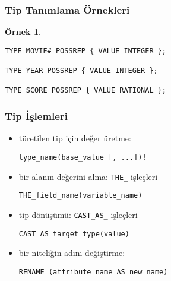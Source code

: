 \documentclass[dvipsnames]{beamer}
\theoremstyle{definition}
\theoremstyle{example}
\newtheorem{ornek}[theorem]{Örnek}
\theoremstyle{plain}
\begin{document}
\begin{frame}[fragile]
  \frametitle{Tip Tanımlama Örnekleri}

  \begin{ornek}
    \begin{lstlisting}
TYPE MOVIE# POSSREP { VALUE INTEGER };

TYPE YEAR POSSREP { VALUE INTEGER };

TYPE SCORE POSSREP { VALUE RATIONAL };
    \end{lstlisting}
  \end{ornek}
\end{frame}

\begin{frame}[fragile]
  \frametitle{Tip İşlemleri}

  \begin{itemize}
    \item türetilen tip için değer üretme:
    \begin{lstlisting}
type_name(base_value [, ...])!
    \end{lstlisting}

    \pause
    \item bir alanın değerini alma: \lstinline!THE_! işleçleri
    \begin{lstlisting}
THE_field_name(variable_name)
    \end{lstlisting}

    \pause
    \item tip dönüşümü: \lstinline!CAST_AS_! işleçleri
    \begin{lstlisting}
CAST_AS_target_type(value)
    \end{lstlisting}

    \pause
    \item bir niteliğin adını değiştirme:
    \begin{lstlisting}
RENAME (attribute_name AS new_name)
    \end{lstlisting}
  \end{itemize}
\end{frame}
\end{document}
